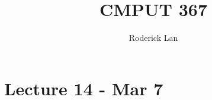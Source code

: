 \documentclass{article}
\title{CMPUT 367}
\author{Roderick Lan}
\date{}
\begin{document}
\maketitle

\tableofcontents
\break

\section*{Lecture 14 - Mar 7}
\end{document}
